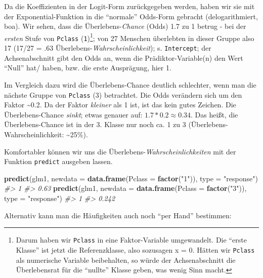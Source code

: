 \documentclass[12pt,ngerman,]{book}
\makeatletter
\newenvironment{Shaded}{\begin{snugshade}}{\end{snugshade}}
\newcommand{\KeywordTok}[1]{\textcolor[rgb]{0.13,0.29,0.53}{\textbf{{#1}}}}
\newcommand{\DataTypeTok}[1]{\textcolor[rgb]{0.13,0.29,0.53}{{#1}}}
\newcommand{\StringTok}[1]{\textcolor[rgb]{0.31,0.60,0.02}{{#1}}}
\newcommand{\CommentTok}[1]{\textcolor[rgb]{0.56,0.35,0.01}{\textit{{#1}}}}
\newcommand{\NormalTok}[1]{{#1}}
\let\rmarkdownfootnote\footnote%
\def\footnote{\protect\rmarkdownfootnote}
\newenvironment{kframe}{%
\medskip{}
\setlength{\fboxsep}{.8em}
 \def\at@end@of@kframe{}%
 \ifinner\ifhmode%
  \def\at@end@of@kframe{\end{minipage}}%
  \begin{minipage}{\columnwidth}%
 \fi\fi%
 \def\FrameCommand##1{\hskip\@totalleftmargin \hskip-\fboxsep
 \colorbox{shadecolor}{##1}\hskip-\fboxsep
     \hskip-\linewidth \hskip-\@totalleftmargin \hskip\columnwidth}%
 \MakeFramed {\advance\hsize-\width
   \@totalleftmargin\z@ \linewidth\hsize
   \@setminipage}}%
 {\par\unskip\endMakeFramed%
 \at@end@of@kframe}
\renewenvironment{Shaded}{\begin{kframe}}{\end{kframe}}
\theoremstyle{definition}
\theoremstyle{definition}
\theoremstyle{remark}
\makeatother
\begin{document}
Da die Koeffizienten in der Logit-Form zurückgegeben werden, haben wir
sie mit der Exponential-Funktion in die ``normale'' Odds-Form gebracht
(delogarithmiert, boa). Wir sehen, dass die Überlebens-\emph{Chance}
(Odds) 1.7 zu 1 betrug - bei der \emph{ersten} Stufe von \texttt{Pclass}
(\texttt{1})\footnote{Darum haben wir \texttt{Pclass} in eine
  Faktor-Variable umgewandelt. Die ``erste Klasse'' ist jetzt die
  Referenzklasse, also sozusagen x = 0. Hätten wir \texttt{Pclass} als
  numerische Variable beibehalten, so würde der Achsenabschnitt die
  Überlebensrat für die ``nullte'' Klasse geben, was wenig Sinn macht.};
von 27 Menschen überlebten in dieser Gruppe also 17 (17/27 = .63
Überlebens-\emph{Wahrscheinlichkeit}); s. \texttt{Intercept}; der
Achsenabschnitt gibt den Odds an, wenn die Prädiktor-Variable(n) den
Wert ``Null'' hat/ haben, bzw. die erste Ausprägung, hier 1.

Im Vergleich dazu wird die Überlebens-Chance deutlich schlechter, wenn
man die nächste Gruppe von \texttt{Pclass} (3) betrachtet. Die Odds
verändern sich um den Faktor \textasciitilde{}0.2. Da der Faktor
\emph{kleiner} als 1 ist, ist das kein gutes Zeichen. Die
Überlebens-Chance \emph{sinkt}; etwas genauer auf:
\(1.7 * 0.2 \approx 0.34\). Das heißt, die Überlebens-Chance ist in der
3. Klasse nur noch ca. 1 zu 3 (Überlebens-Wahrscheinlichkeit:
\textasciitilde{}25\%).

Komfortabler können wir uns die Überlebens-\emph{Wahrscheinlichkeiten}
mit der Funktion \texttt{predict} ausgeben lassen.

\begin{Shaded}
\begin{Highlighting}[]
\KeywordTok{predict}\NormalTok{(glm1, }\DataTypeTok{newdata =} \KeywordTok{data.frame}\NormalTok{(}\DataTypeTok{Pclass =} \KeywordTok{factor}\NormalTok{(}\StringTok{"1"}\NormalTok{)), }\DataTypeTok{type =} \StringTok{"response"}\NormalTok{)}
\CommentTok{#>    1 }
\CommentTok{#> 0.63}
\KeywordTok{predict}\NormalTok{(glm1, }\DataTypeTok{newdata =} \KeywordTok{data.frame}\NormalTok{(}\DataTypeTok{Pclass =} \KeywordTok{factor}\NormalTok{(}\StringTok{"3"}\NormalTok{)), }\DataTypeTok{type =} \StringTok{"response"}\NormalTok{)}
\CommentTok{#>     1 }
\CommentTok{#> 0.242}
\end{Highlighting}
\end{Shaded}

Alternativ kann man die Häufigkeiten auch noch ``per Hand'' bestimmen:
\end{document}
